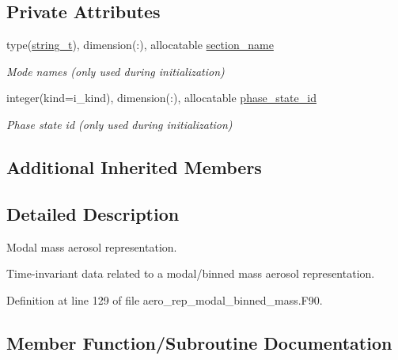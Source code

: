 \subsection*{Private Attributes}
\begin{DoxyCompactItemize}
\item 
type(\mbox{\hyperlink{structpmc__util_1_1string__t}{string\+\_\+t}}), dimension(\+:), allocatable \mbox{\hyperlink{structpmc__aero__rep__modal__binned__mass_1_1aero__rep__modal__binned__mass__t_a910483b9e215df7d1d1e61f7a8d5c797}{section\+\_\+name}}
\begin{DoxyCompactList}\small\item\em Mode names (only used during initialization) \end{DoxyCompactList}\item 
integer(kind=i\+\_\+kind), dimension(\+:), allocatable \mbox{\hyperlink{structpmc__aero__rep__modal__binned__mass_1_1aero__rep__modal__binned__mass__t_ae151ff829c92e77ab3cede857858f0a5}{phase\+\_\+state\+\_\+id}}
\begin{DoxyCompactList}\small\item\em Phase state id (only used during initialization) \end{DoxyCompactList}\end{DoxyCompactItemize}
\subsection*{Additional Inherited Members}


\subsection{Detailed Description}
Modal mass aerosol representation. 

Time-\/invariant data related to a modal/binned mass aerosol representation. 

Definition at line 129 of file aero\+\_\+rep\+\_\+modal\+\_\+binned\+\_\+mass.\+F90.



\subsection{Member Function/\+Subroutine Documentation}
\mbox{\label{structpmc__aero__rep__modal__binned__mass_1_1aero__rep__modal__binned__mass__t_ad8bf1dc9ee795364a0f3d903ab0b8f0e}} 
